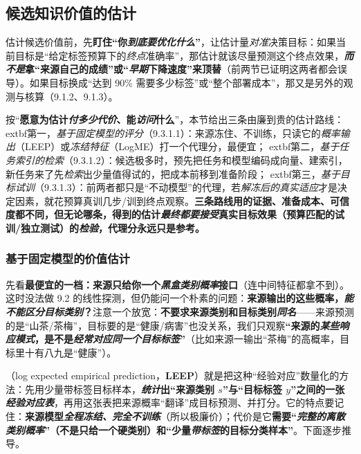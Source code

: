 \subsection{候选知识价值的估计}
\label{sec:ket-reuse-value-estimation}

估计候选价值前，先\textbf{盯住“你\emph{到底要优化什么}”}，让估计量\emph{对准}决策目标：如果当前目标是“给定标签预算下的\emph{终点}准确率”，那估计就该尽量预测这个终点效果，\textbf{\emph{而不是}拿“来源自己的成绩”或“\emph{早期}下降速度”来顶替}（前两节已证明这两者都会误导）。如果目标换成“达到 90\% 需要多少标签”或“整个部署成本”，那又是另外的观测与核算（9.1.2、9.1.3）。

按“\textbf{愿意为估计\emph{付多少代价}、能\emph{访问}什么}”，本节给出三条由廉到贵的估计路线：	extbf{第一，\emph{基于固定模型的评分}（9.3.1.1）}：来源冻住、不训练，只读它的\emph{概率输出}（LEEP）或\emph{冻结特征}（LogME）打一个代理分，最便宜；	extbf{第二，\emph{基于任务索引的检索}（9.3.1.2）}：候选极多时，预先把任务和模型编码成向量、建索引，新任务来了先\emph{检索}出少量值得试的，把成本前移到准备阶段；	extbf{第三，\emph{基于目标试训}（9.3.1.3）}：前两者都只是“不动模型”的代理，若\emph{解冻后的真实适应}才是决定因素，就花预算真训几步/训到终点观察。\textbf{三条路线用的证据、准备成本、可信度都不同，但\textbf{无论哪条，得到的估计\emph{最终都要接受}真实目标效果（预算匹配的试训/独立测试）的\emph{检验}}，代理分永远只是参考。}

\subsubsection{基于固定模型的价值估计}
\label{sec:ket-reuse-fixed-score}

先看\textbf{最便宜的一档：来源只给你一个\emph{黑盒类别概率}接口}（连中间特征都拿不到）。这时没法做 9.2 的线性探测，但仍能问一个朴素的问题：\textbf{来源输出的这些概率，\emph{能不能\emph{区分}目标类别}？}注意一个放宽：\textbf{不要求来源类别和目标类别\emph{同名}}——来源预测的是“山茶/茶梅”，目标要的是“健康/病害”也没关系，我们只观察\textbf{“来源的\emph{某些响应模式}，是不是\emph{经常对应\emph{同一个}目标标签}”}（比如来源一输出“茶梅”的高概率，目标里十有八九是“健康”）。

（log expected empirical prediction，\textbf{LEEP}）就是把这种“经验对应”数量化的方法：先用少量带标签目标样本，\textbf{\emph{统计}出“来源类别 $s$”与“目标标签 $y$”之间的一张\emph{经验对应表}}，再用这张表把来源概率“翻译”成目标预测、并打分。它的特点要记住：\textbf{来源模型\emph{全程冻结、完全不训练}}（所以极廉价）；代价是它\textbf{需要“\emph{完整的离散类别概率}”（不是只给一个硬类别）和“少量\emph{带标签}的目标分类样本”}。下面逐步推导。

